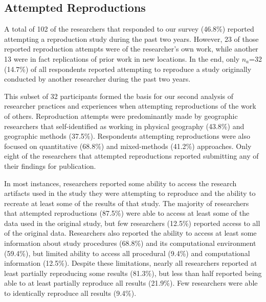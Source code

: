 \documentclass[]{interact}
\theoremstyle{plain}%
\theoremstyle{definition}
\theoremstyle{remark}
\begin{document}
\subsection*{Attempted Reproductions}
A total of 102 of the researchers that responded to our survey (46.8\%) reported attempting a reproduction study during the past two years.
However, 23 of those reported reproduction attempts were of the researcher's own work, while another 13 were in fact replications of prior work in new locations.
In the end, only \textit{$n_{a}$}=32 (14.7\%) of all respondents reported attempting to reproduce a study originally conducted by another researcher during the past two years.

This subset of 32 participants formed the basis for our second analysis of researcher practices and experiences when attempting reproductions of the work of others.
Reproduction attempts were predominantly made by geographic researchers that self-identified as working in physical geography (43.8\%) and geographic methods (37.5\%).
Respondents attempting reproductions were also focused on quantitative (68.8\%) and mixed-methods (41.2\%) approaches. 
Only eight of the researchers that attempted reproductions reported submitting any of their findings for publication.

In most instances, researchers reported some ability to access the research artifacts used in the study they were attempting to reproduce and the ability to recreate at least some of the results of that study.  
The majority of researchers that attempted reproductions (87.5\%) were able to access at least some of the data used in the original study, but few researchers (12.5\%) reported access to all of the original data.
Researchers also reported the ability to access at least some information about study procedures (68.8\%) and its computational environment (59.4\%), but limited ability to access all procedural (9.4\%) and computational information (12.5\%). 
Despite these limitations, nearly all researchers reported at least partially reproducing some results (81.3\%), but less than half reported being able to at least partially reproduce all results (21.9\%).
Few researchers were able to identically reproduce all results (9.4\%).  
\end{document}
